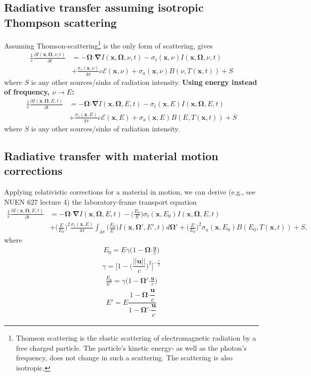 \documentclass[10pt,letterpaper,notitlepage]{article}
\numberwithin{equation}{section}
\newcommand{\Omegabf}{\mathbf{\Omega}}
\newcommand{\bnabla}{\boldsymbol{\nabla}}
\newcommand{\position}{\mathbf{x}}
\newcommand{\dotp}{\boldsymbol{\cdot}}
\newcommand{\RadE}{\mathcal{E}}
\newcommand{\beqn}{\begin{equation}\begin{aligned}}
\newcommand{\eeqn}{\end{aligned}\end{equation}}
\begin{document}
\subsection{Radiative transfer assuming isotropic Thompson scattering}
Assuming Thomson-scattering\footnote{Thomson scattering is the elastic scattering of electromagnetic radiation by a free charged particle. The particle's kinetic energy- as well as the photon's frequency, does not change in such a scattering. The scattering is also isotropic.} is the only form of scattering, gives
\beqn 
\frac{1}{c} \frac{\partial I(\position, \Omegabf, \nu, t)}{\partial t} &=
-\Omegabf \dotp \bnabla I(\position, \Omegabf, \nu, t)
- \sigma_t(\position,\nu) I(\position, \Omegabf, \nu, t) \\
&+ \frac{\sigma_s(\position,\nu)}{4\pi} c \RadE(\position, \nu)
+ \sigma_a(\position,\nu) B(\nu,T(\position, t))+S
\eeqn 
where $S$ is any other sources/sinks of radiation intensity. 
\newline
\newline
\textbf{Using energy instead of frequency, $\nu\to E$:}
\beqn 
\frac{1}{c} \frac{\partial I(\position, \Omegabf, E, t)}{\partial t} &=
-\Omegabf \dotp \bnabla I(\position, \Omegabf, E, t)
- \sigma_t(\position,E) I(\position, \Omegabf, E, t) \\
&+ \frac{\sigma_s(\position,E)}{4\pi} c \RadE(\position, E)
+ \sigma_a(\position,E) B(E,T(\position, t))+S
\eeqn 
where $S$ is any other sources/sinks of radiation intensity. 

\subsection{Radiative transfer with material motion corrections}
Applying relativistic corrections for a material in motion, we can derive (e.g., see NUEN 627 lecture 4) the laboratory-frame transport equation
\beqn 
\frac{1}{c} \frac{\partial I(\position, \Omegabf, E, t)}{\partial t} &=
-\Omegabf \dotp \bnabla I(\position, \Omegabf, E, t)
- \biggr(\frac{E_0}{E}\biggr)\sigma_t(\position,E_0) I(\position, \Omegabf, E, t) \\
&+ \biggr(\frac{E}{E_0}\biggr)^2\frac{\sigma_s(\position,E)}{4\pi} \int_{4\pi} \biggr(\frac{E_0}{E'}\biggr) I(\position, \Omegabf', E', t) d\Omegabf'
+ \biggr(\frac{E}{E_0}\biggr)^2 \sigma_a(\position,E_0) B(E_0,T(\position, t))+S,
\eeqn 
where
\beqn 
E_0 = E \gamma \biggr(1-\Omegabf \dotp \frac{\mathbf{u}}{c}\biggr)
\eeqn 
\beqn 
\gamma = \biggr[ 1-\biggr(\dfrac{||\mathbf{u}||}{c}\biggr)^2 \biggr]^{-\frac{1}{2}}
\eeqn 
\beqn 
\frac{E_0}{E'} = \gamma \biggr(1-\Omegabf' \dotp \frac{\mathbf{u}}{c} \biggr)
\eeqn 
\beqn 
E' = E \dfrac{1-\Omegabf \dotp \dfrac{\mathbf{u}}{c}}{1-\Omegabf' \dotp \dfrac{\mathbf{u}}{c}}
\eeqn 
\end{document}
